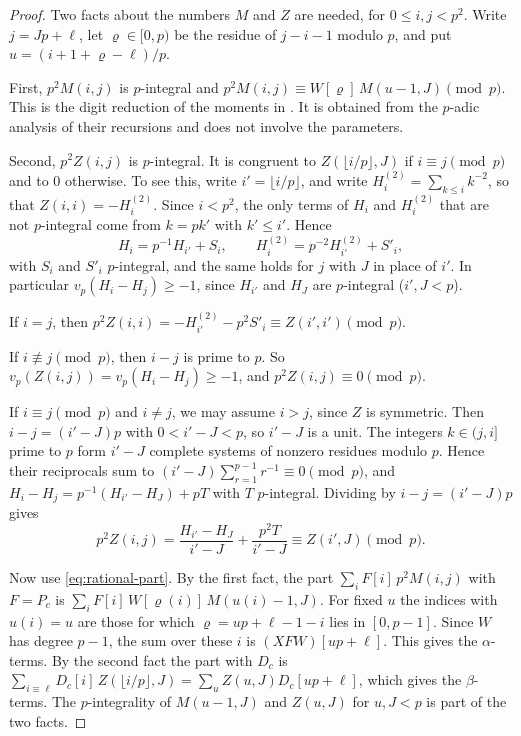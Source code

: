 \documentclass[11pt]{amsart}
\theoremstyle{definition}
\theoremstyle{remark}
\numberwithin{equation}{section}
\begin{document}
\begin{proof}
Two facts about the numbers $M$ and $Z$ are needed, for $0\le i,j<p^2$. Write $j=Jp+\ell$, let
$\varrho\in[0,p)$ be the residue of $j-i-1$ modulo $p$, and put $u=(i+1+\varrho-\ell)/p$.

First, $p^2M(i,j)$ is $p$-integral and $p^2M(i,j)\equiv W[\varrho]\,M(u-1,J)\pmod p$. This is the digit
reduction of the moments in \cite[\S3]{OpenAI2026}. It is obtained from the $p$-adic analysis of their
recursions and does not involve the parameters.

Second, $p^2Z(i,j)$ is $p$-integral. It is congruent to $Z(\lfloor i/p\rfloor,J)$ if $i\equiv j\pmod p$ and
to $0$ otherwise. To see this, write $i'=\lfloor i/p\rfloor$, and write $H^{(2)}_i=\sum_{k\le i}k^{-2}$, so
that $Z(i,i)=-H^{(2)}_i$. Since $i<p^2$, the only terms of $H_i$ and $H^{(2)}_i$ that are not $p$-integral
come from $k=pk'$ with $k'\le i'$. Hence
\[
 H_i=p^{-1}H_{i'}+S_i,\qquad H^{(2)}_i=p^{-2}H^{(2)}_{i'}+S'_i,
\]
with $S_i$ and $S'_i$ $p$-integral, and the same holds for $j$ with $J$ in place of $i'$. In particular
$v_p(H_i-H_j)\ge-1$, since $H_{i'}$ and $H_J$ are $p$-integral ($i',J<p$).

If $i=j$, then $p^2Z(i,i)=-H^{(2)}_{i'}-p^2S'_i\equiv Z(i',i')\pmod p$.

If $i\not\equiv j\pmod p$, then $i-j$ is prime to $p$. So $v_p(Z(i,j))=v_p(H_i-H_j)\ge-1$, and
$p^2Z(i,j)\equiv0\pmod p$.

If $i\equiv j\pmod p$ and $i\ne j$, we may assume $i>j$, since $Z$ is symmetric. Then $i-j=(i'-J)p$
with $0<i'-J<p$, so $i'-J$ is a unit. The integers $k\in(j,i]$ prime to $p$ form $i'-J$ complete systems
of nonzero residues modulo $p$. Hence their reciprocals sum to $(i'-J)\sum_{r=1}^{p-1}r^{-1}\equiv0\pmod p$,
and $H_i-H_j=p^{-1}(H_{i'}-H_J)+pT$ with $T$ $p$-integral. Dividing by $i-j=(i'-J)p$ gives
\[
 p^2Z(i,j)=\frac{H_{i'}-H_J}{i'-J}+\frac{p^2T}{i'-J}\equiv Z(i',J)\pmod p .
\]

Now use \eqref{eq:rational-part}. By the first fact, the part $\sum_iF[i]\,p^2M(i,j)$ with $F=P_c$ is
$\sum_iF[i]\,W[\varrho(i)]\,M(u(i)-1,J)$. For fixed $u$ the indices with $u(i)=u$ are those for which
$\varrho=up+\ell-1-i$ lies in $[0,p-1]$. Since $W$ has degree $p-1$, the sum over these $i$ is
$(XFW)[up+\ell]$. This gives the $\alpha$-terms. By the second fact the part with $D_c$ is
$\sum_{i\equiv\ell}D_c[i]\,Z(\lfloor i/p\rfloor,J)=\sum_uZ(u,J)D_c[up+\ell]$, which gives the $\beta$-terms.
The $p$-integrality of $M(u-1,J)$ and $Z(u,J)$ for $u,J<p$ is part of the two facts.
\end{proof}
\end{document}
